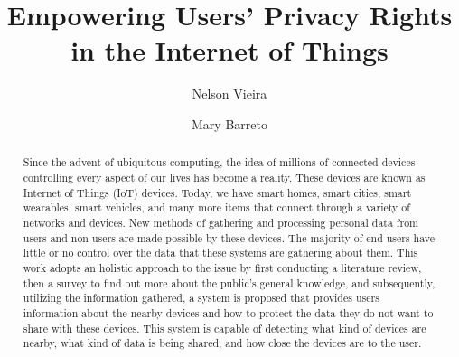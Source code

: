\documentclass[manuscript,natbib=false]{acmart}
\begin{document}
\title{Empowering Users' Privacy Rights in the Internet of Things}

\author{Nelson Vieira}

\author{Mary Barreto}
\authornote{}

\renewcommand{\shortauthors}{Vieira and Barreto}

\begin{abstract}
    Since the advent of ubiquitous computing, the idea of millions of connected
    devices controlling every aspect of our lives has become a reality. These
    devices are known as Internet of Things (IoT) devices. Today, we have smart
    homes, smart cities, smart wearables, smart vehicles, and many more items
    that connect through a variety of networks and devices. New methods of
    gathering and processing personal data from users and non-users are
    made possible by these devices. The majority of end users have little
    or no control over the data that these systems are gathering about them.
    This work adopts an holistic approach to the issue by first conducting a
    literature review, then a survey to find out more about the public's
    general knowledge, and subsequently, utilizing the information gathered,
    a system is proposed that provides users information about the nearby
    devices and how to protect the data they do not want to share with these
    devices. This system is capable of detecting what kind of devices are
    nearby, what kind of data is being shared, and how close the devices
    are to the user.
    \end{abstract}
\end{document}
